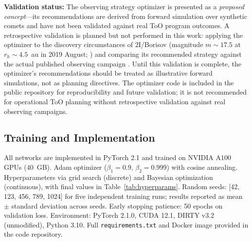 \documentclass[usenatbib]{mnras}
\begin{document}
\textbf{Validation status:} The observing strategy optimizer is presented as a \textit{proposed concept}---its recommendations are derived from forward simulation over synthetic comets and have not been validated against real ToO program outcomes. A retrospective validation is planned but not performed in this work: applying the optimizer to the discovery circumstances of 2I/Borisov (magnitude $m \sim 17.5$ at $r_h \sim 4.5$~au in 2019 August; \citealt{guzik19}) and comparing its recommended strategy against the actual published observing campaign \citep{clements21,bodewits20}. Until this validation is complete, the optimizer's recommendations should be treated as illustrative forward simulations, not as planning directives. The optimizer code is included in the public repository for reproducibility and future validation; it is not recommended for operational ToO planning without retrospective validation against real observing campaigns.

\subsection{Training and Implementation}

All networks are implemented in PyTorch 2.1 and trained on NVIDIA A100 GPUs (40~GB). Adam optimizer ($\beta_1=0.9$, $\beta_2=0.999$) with cosine annealing. Hyperparameters via grid search (discrete) and Bayesian optimization (continuous), with final values in Table~\ref{tab:hyperparams}. Random seeds: [42, 123, 456, 789, 1024] for five independent training runs; results reported as mean $\pm$ standard deviation across seeds. Early stopping patience: 50 epochs on validation loss. Environment: PyTorch 2.1.0, CUDA 12.1, DIRTY v3.2 (unmodified), Python 3.10. Full \texttt{requirements.txt} and Docker image provided in the code repository.
\end{document}
